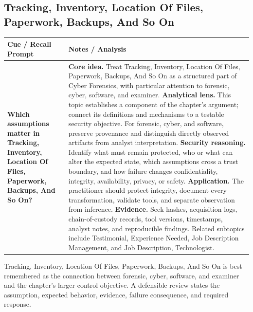 \documentclass[11pt]{article}
\newcommand{\CornellHeader}{%
\rowcolor{Navy}\color{white}\bfseries Cue / Recall Prompt & \color{white}\bfseries Notes / Analysis\\\hline}
\newcommand{\CornellRow}[2]{%
\cellcolor{CueGray}\RaggedRight\textbf{#1} & \RaggedRight #2\\\hline}
\begin{document}
\subsection*{Tracking, Inventory, Location Of Files, Paperwork, Backups, And So On}
\begin{longtable}{>{\RaggedRight\arraybackslash}p{}|>{\RaggedRight\arraybackslash}p{}}
\CornellHeader
\CornellRow{Which assumptions matter in Tracking, Inventory, Location Of Files, Paperwork, Backups, And So On?}{\textbf{Core idea.} Treat Tracking, Inventory, Location Of Files, Paperwork, Backups, And So On as a structured part of Cyber Forensics, with particular attention to forensic, cyber, software, and examiner. \textbf{Analytical lens.} This topic establishes a component of the chapter's argument; connect its definitions and mechanisms to a testable security objective. For forensic, cyber, and software, preserve provenance and distinguish directly observed artifacts from analyst interpretation. \textbf{Security reasoning.} Identify what must remain protected, who or what can alter the expected state, which assumptions cross a trust boundary, and how failure changes confidentiality, integrity, availability, privacy, or safety. \textbf{Application.} The practitioner should protect integrity, document every transformation, validate tools, and separate observation from inference. \textbf{Evidence.} Seek hashes, acquisition logs, chain-of-custody records, tool versions, timestamps, analyst notes, and reproducible findings. Related subtopics include Testimonial, Experience Needed, Job Description Management, and Job Description, Technologist.}
\end{longtable}
\begin{topicsummary}
Tracking, Inventory, Location Of Files, Paperwork, Backups, And So On is best remembered as the connection between forensic, cyber, software, and examiner and the chapter's larger control objective. A defensible review states the assumption, expected behavior, evidence, failure consequence, and required response.
\end{topicsummary}
\end{document}
